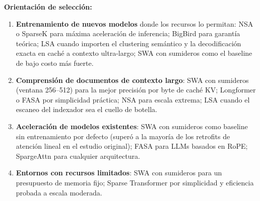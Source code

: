 \textbf{Orientación de selección:}
\begin{enumerate}[leftmargin=*]
    \item \textbf{Entrenamiento de nuevos modelos} donde los recursos lo permitan: NSA o SparseK para máxima aceleración de inferencia; BigBird para garantía teórica; LSA cuando importen el clustering semántico y la decodificación exacta en caché a contexto ultra-largo; SWA con sumideros como el baseline de bajo costo más fuerte.
    \item \textbf{Comprensión de documentos de contexto largo}: SWA con sumideros (ventana 256--512) para la mejor precisión por byte de caché KV; Longformer o FASA por simplicidad práctica; NSA para escala extrema; LSA cuando el escaneo del indexador sea el cuello de botella.
    \item \textbf{Aceleración de modelos existentes}: SWA con sumideros como baseline sin entrenamiento por defecto (superó a la mayoría de los retrofits de atención lineal en el estudio original); FASA para LLMs basados en RoPE; SpargeAttn para cualquier arquitectura.
    \item \textbf{Entornos con recursos limitados}: SWA con sumideros para un presupuesto de memoria fijo; Sparse Transformer por simplicidad y eficiencia probada a escala moderada.
\end{enumerate}

